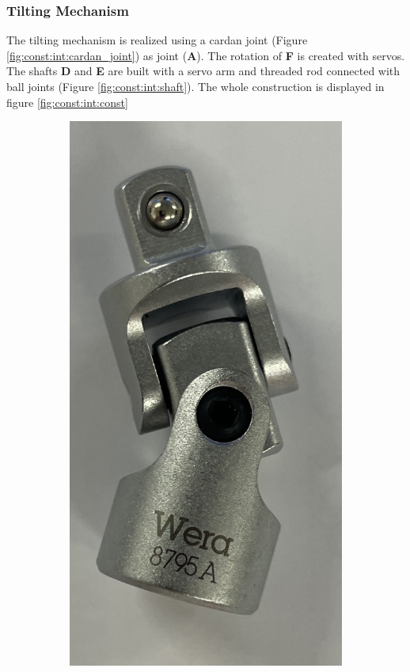 \subsubsection*{Tilting Mechanism}

The tilting mechanism is realized using a cardan joint (Figure \ref{fig:const:int:cardan_joint}) as joint (\textbf{A}). The rotation of \textbf{F} is created with servos. The shafts \textbf{D} and \textbf{E} are built with a servo arm and threaded rod connected with ball joints (Figure \ref{fig:const:int:shaft}). The whole construction is displayed in figure \ref{fig:const:int:const}
%
\begin{figure}[ht]
  \begin{subfigure}[b]{0.174\textwidth}
    \includegraphics[width=\textwidth]{src/assets/pictures/construction/cardan_joint.JPG}

\end{subfigure}
\end{figure}
